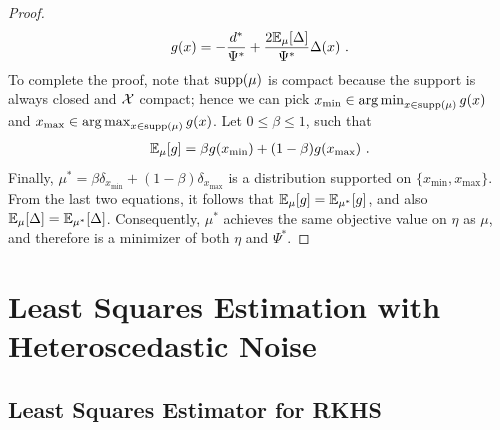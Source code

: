 \begin{proof}
	\begin{align*}
	g(x) = - \frac{d^*}{\Psi^*} + \frac{2\mathbb{E}_\mu[\Delta]}{\Psi^*} \Delta(x) \text{ .}
	\end{align*}
	To complete the proof, note that $\text{supp}(\mu)$ is compact because the support is always closed and $\mathcal{X}$ compact; hence we can pick $x_{\min} \in \operatorname*{arg\,min}_{x \in \text{supp}(\mu)} g(x)$ and $x_{\max} \in \operatorname*{arg\,max}_{x \in \text{supp}(\mu)} g(x)$. Let $0 \leq \beta \leq 1$, such that
	\begin{align*}
	\mathbb{E}_{\mu}[g] = \beta g(x_{\min}) + (1-\beta) g(x_{\max}) \text{ .}
	\end{align*}
	Finally, $\mu^* = \beta \delta_{x_{\min}} + (1-\beta) \delta_{x_{\max}}$ is a distribution supported on $\{x_{\min}, x_{\max}\}$. From the last two equations, it follows that $\mathbb{E}_{\mu}[g] = \mathbb{E}_{\mu^*}[g]$, and also  $\mathbb{E}_{\mu}[\Delta] = \mathbb{E}_{\mu^*}[\Delta]$. Consequently, $\mu^*$ achieves the same objective value on $\eta$ as $\mu$, and therefore is a minimizer of both $\eta$ and $\Psi^*$.
\end{proof}

\section{Least Squares Estimation with Heteroscedastic Noise} \label{app: least squares estimation with heteroscedastic noise}
\subsection{Least Squares Estimator for RKHS}

